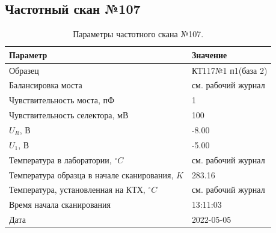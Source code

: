 \subsection{Частотный скан №107}
\begin{table}[!ht]
    \centering
    \caption{Параметры частотного скана №107.}
    \begin{tabular}{|l|l|}
        \hline
        Параметр                                       & Значение                  \\ \hline
        Образец                                        & КТ117№1 п1(база 2)        \\ \hline
        Балансировка моста                             & см. рабочий журнал        \\ \hline
        Чувствительность моста, пФ                     & 1                         \\ \hline
        Чувствительность селектора, мВ                 & 100                       \\ \hline
        $U_R$, В                                       & -8.00                     \\ \hline
        $U_1$, В                                       & -5.00                     \\ \hline
        Температура в лаборатории, $^\circ C$          & см. рабочий журнал        \\ \hline
        Температура образца в начале сканирования, $K$ & 283.16                    \\ \hline
        Температура, установленная на КТХ, $^\circ C$  & см. рабочий журнал        \\ \hline
        Время начала сканирования                      & 13:11:03                  \\ \hline
        Дата                                           & 2022-05-05                \\ \hline
    \end{tabular}
    \label{table:frequency_scan_107}
\end{table}


